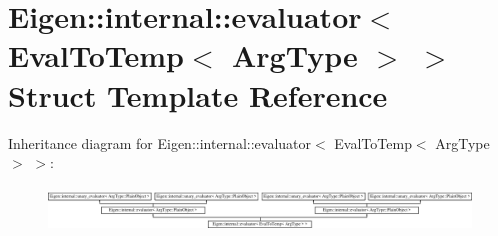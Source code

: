 \hypertarget{struct_eigen_1_1internal_1_1evaluator_3_01_eval_to_temp_3_01_arg_type_01_4_01_4}{}\section{Eigen\+:\+:internal\+:\+:evaluator$<$ Eval\+To\+Temp$<$ Arg\+Type $>$ $>$ Struct Template Reference}
\label{struct_eigen_1_1internal_1_1evaluator_3_01_eval_to_temp_3_01_arg_type_01_4_01_4}
Inheritance diagram for Eigen\+:\+:internal\+:\+:evaluator$<$ Eval\+To\+Temp$<$ Arg\+Type $>$ $>$\+:\begin{figure}[H]
\begin{center}
\leavevmode
\includegraphics[height=1.224490cm]{struct_eigen_1_1internal_1_1evaluator_3_01_eval_to_temp_3_01_arg_type_01_4_01_4}
\end{center}
\end{figure}
